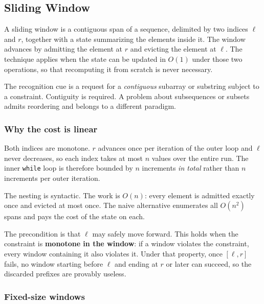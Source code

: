 \subsection{Sliding Window}

A sliding window is a contiguous span of a sequence, delimited by two indices
$\ell$ and $r$, together with a state summarizing the elements inside it. The
window advances by admitting the element at $r$ and evicting the element at
$\ell$. The technique applies when the state can be updated in $O(1)$ under
those two operations, so that recomputing it from scratch is never necessary.

The recognition cue is a request for a \emph{contiguous} subarray or substring
subject to a constraint. Contiguity is required. A problem about subsequences
or subsets admits reordering and belongs to a different paradigm.

\subsubsection*{Why the cost is linear}

\begin{keybox}
Both indices are monotone. $r$ advances once per iteration of the outer loop
and $\ell$ never decreases, so each index takes at most $n$ values over the
entire run. The inner \texttt{while} loop is therefore bounded by $n$
increments \emph{in total} rather than $n$ increments per outer iteration.

The nesting is syntactic. The work is $O(n)$: every element is admitted exactly
once and evicted at most once. The naive alternative enumerates all $O(n^2)$
spans and pays the cost of the state on each.
\end{keybox}

The precondition is that $\ell$ may safely move forward. This holds when the
constraint is \textbf{monotone in the window}: if a window violates the
constraint, every window containing it also violates it. Under that property,
once $[\ell, r]$ fails, no window starting before $\ell$ and ending at $r$ or
later can succeed, so the discarded prefixes are provably useless.

\subsubsection*{Fixed-size windows}

